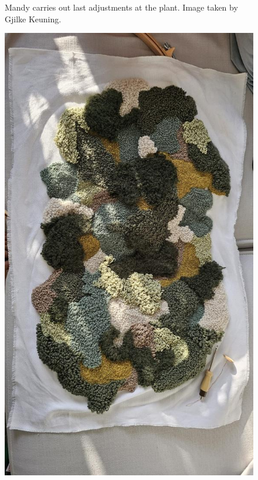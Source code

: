 \documentclass[authordate, empirical,issue]{jote-new-article}
\begin{document}
{\begin{figure}
		\caption{Mandy carries out last adjustments at the plant. Image taken by Gjilke Keuning.}



	\end{figure}









	\begin{figure}
		\includegraphics[width=\linewidth]{media/fig3.jpeg}


\end{figure}}
\end{document}
